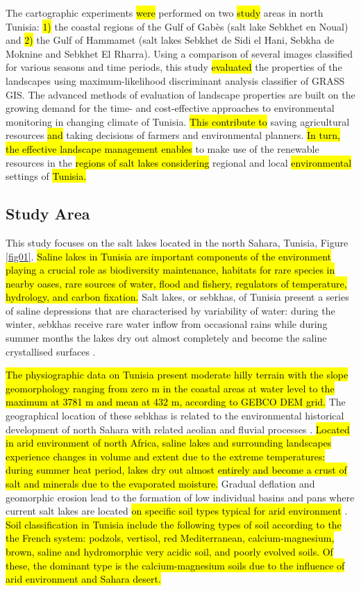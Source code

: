 \documentclass[land,article,submit,pdftex,moreauthors]{Definitions/mdpi}
\begin{document}
The cartographic experiments \hl{were} performed on two \hl{study} areas in north Tunisia: \hl{1)} the coastal regions of the Gulf of Gabès (salt lake Sebkhet en Noual) and \hl{2) }the Gulf of Hammamet (salt lakes Sebkhet de Sidi el Hani, Sebkha de Moknine and Sebkhet El Rharra). Using a comparison of several images classified for various seasons and time periods, this study \hl{evaluated} the properties of the landscapes using maximum-likelihood discriminant analysis classifier of GRASS GIS. The advanced methods of evaluation of landscape properties are built on the growing demand for the time- and cost-effective approaches to environmental monitoring in changing climate of Tunisia. \hl{This contribute to }saving agricultural resources \hl{and} taking decisions of farmers and environmental planners. \hl{In turn, the effective landscape management enables} to make use of the renewable resources in the \hl{regions of salt lakes considering} regional and local \hl{environmental} settings of \hl{Tunisia.}

\subsection{Study Area}

This study focuses on the salt lakes located in the north Sahara, Tunisia, Figure \ref{fig01}. \hl{Saline lakes in Tunisia are important components of the environment playing a crucial role as biodiversity maintenance, habitats for rare species in nearby oases, rare sources of water, flood and fishery, regulators of temperature, hydrology, and carbon fixation. }Salt lakes, or sebkhas, of Tunisia present a series of saline depressions that are characterised by variability of water: during the winter, sebkhas receive rare water inflow from occasional rains while during summer months the lakes dry out almost completely and become the saline crystallised surfaces \cite{berthon1970saumures,m2001valorisation,Gautier}. 

\hl{The physiographic data on Tunisia present moderate hilly terrain with the slope geomorphology ranging from zero m in the coastal areas at water level to the maximum at 3781 m and mean at 432 m, according to GEBCO DEM grid. }The geographical location of these sebkhas is related to the environmental historical development of north Sahara with related aeolian and fluvial processes \cite{ALI20231,MWIRICHIA2023269}. \hl{Located in arid environment of north Africa, saline lakes and surrounding landscapes experience changes in volume and extent due to the extreme temperatures: during summer heat period, lakes dry out almost entirely and become a crust of salt and minerals due to the evaporated moisture. }Gradual deflation and geomorphic erosion lead to the formation of low individual basins and pans where current salt lakes are located \hl{on specific soil types typical for arid environment }\cite{Blackwelder140}. \hl{Soil classification in Tunisia include the following types of soil according to the the French system: podzols, vertisol, red Mediterranean, calcium-magnesium, brown, saline and hydromorphic very acidic soil, and poorly evolved soils. Of these, the dominant type is the calcium-magnesium soils due to the influence of arid environment and Sahara desert.}
\end{document}
